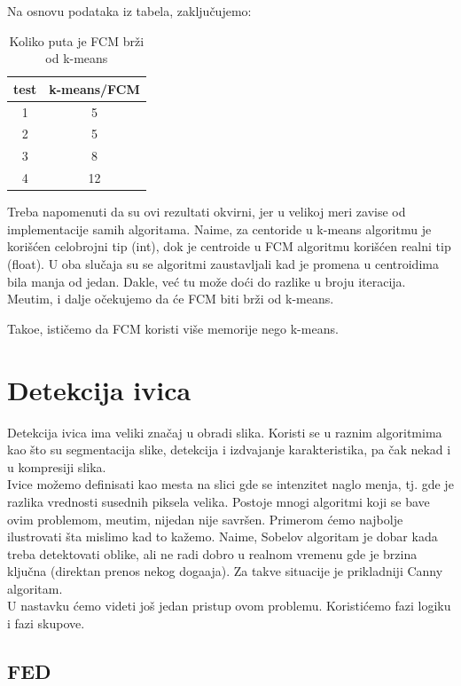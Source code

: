 \documentclass[12pt,a4paper]{article}
\theoremstyle{definition}
\theoremstyle{remark}
\theoremstyle{plain}
\begin{document}
Na osnovu podataka iz tabela, zaklju\v cujemo:
\begin{table}[H]
\centering
\begin{tabular}{c|c}
  test & k-means/FCM\\
  \hline
  1 & 5 \\
  2 & 5 \\
  3 & 8 \\
  4 & 12
\end{tabular}
  \caption{Koliko puta je FCM br\v zi od k-means}
\end{table}

Treba napomenuti da su ovi rezultati okvirni, jer u velikoj meri zavise od implementacije samih algoritama. Naime, za centoride u k-means algoritmu je kori\v s\' cen celobrojni tip (int), dok je centroide u FCM algoritmu kori\v s\' cen realni tip (float). U oba slu\v caja su se algoritmi zaustavljali kad je promena u centroidima bila manja od jedan. Dakle, ve\' c tu mo\v ze do\' ci do razlike u broju iteracija. Me\dj utim, i dalje o\v cekujemo da \' ce FCM biti br\v zi od k-means.

Tako\dj e, isti\v cemo da FCM koristi vi\v se memorije nego k-means.

\section{Detekcija ivica}

Detekcija ivica ima veliki zna\v caj u obradi slika. Koristi se u raznim algoritmima kao \v sto su segmentacija slike, detekcija i izdvajanje karakteristika, pa \v cak nekad i u kompresiji slika.\\

Ivice mo\v zemo definisati kao mesta na slici gde se intenzitet naglo menja, tj. gde je razlika vrednosti susednih piksela velika. Postoje mnogi algoritmi koji se bave ovim problemom, me\dj utim, nijedan nije savr\v sen. Primerom \' cemo najbolje ilustrovati \v sta mislimo kad to ka\v zemo. Naime, Sobelov algoritam je dobar kada treba detektovati oblike, ali ne radi dobro u realnom vremenu gde je brzina klju\v cna (direktan prenos nekog doga\dj aja). Za takve situacije je prikladniji Canny algoritam.\\

U nastavku \' cemo videti jo\v s jedan pristup ovom problemu. Koristi\' cemo fazi logiku i fazi skupove.

\subsection{FED}
\end{document}
